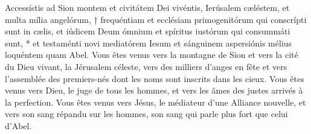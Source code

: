 \documentclass[Session2024.tex]{subfiles}
\begin{document}







{Accessístis ad Sion montem et civitátem Dei vivéntis, Ierúsalem
cæléstem, et multa mília angelórum, † frequéntiam et ecclésiam
primogenitórum qui conscrípti sunt in cælis, et iúdicem Deum ómnium et
spíritus iustórum qui consummáti sunt, * et testaménti novi mediatórem
Iesum et sánguinem aspersiónis mélius loquéntem quam Abel.}
{Vous êtes venus vers la montagne de Sion et vers la cité du Dieu vivant,
la Jérusalem céleste, vers des milliers d’anges en fête et vers l’assemblée
des premiers-nés dont les noms sont inscrits dans les cieux. Vous êtes
venus vers Dieu, le juge de tous les hommes, et vers les âmes des justes
arrivés à la perfection. Vous êtes venus vers Jésus, le médiateur d’une
Alliance nouvelle, et vers son sang répandu sur les hommes, son sang qui
parle plus fort que celui d’Abel.}




\label{TO16}

\blessing

\end{document}
